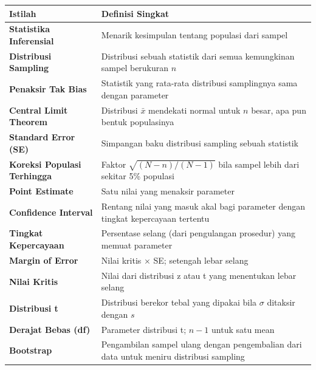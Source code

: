 \documentclass[
  indonesian,
  letterpaper,
]{book}
\newcounter{none} %
\begin{document}
{\def\LTcaptype{none} %
\begin{longtable}[]{@{}
  >{\raggedright\arraybackslash}p{}
  >{\raggedright\arraybackslash}p{}@{}}
\toprule\noalign{}
\begin{minipage}[b]{\linewidth}\raggedright
Istilah
\end{minipage} & \begin{minipage}[b]{\linewidth}\raggedright
Definisi Singkat
\end{minipage} \\
\midrule\noalign{}
\endhead
\bottomrule\noalign{}
\endlastfoot
\textbf{Statistika Inferensial} & Menarik kesimpulan tentang populasi
dari sampel \\
\textbf{Distribusi Sampling} & Distribusi sebuah statistik dari semua
kemungkinan sampel berukuran \(n\) \\
\textbf{Penaksir Tak Bias} & Statistik yang rata-rata distribusi
samplingnya sama dengan parameter \\
\textbf{Central Limit Theorem} & Distribusi \(\bar{x}\) mendekati normal
untuk \(n\) besar, apa pun bentuk populasinya \\
\textbf{Standard Error (SE)} & Simpangan baku distribusi sampling sebuah
statistik \\
\textbf{Koreksi Populasi Terhingga} & Faktor \(\sqrt{(N-n)/(N-1)}\) bila
sampel lebih dari sekitar 5\% populasi \\
\textbf{Point Estimate} & Satu nilai yang menaksir parameter \\
\textbf{Confidence Interval} & Rentang nilai yang masuk akal bagi
parameter dengan tingkat kepercayaan tertentu \\
\textbf{Tingkat Kepercayaan} & Persentase selang (dari pengulangan
prosedur) yang memuat parameter \\
\textbf{Margin of Error} & Nilai kritis \(\times\) SE; setengah lebar
selang \\
\textbf{Nilai Kritis} & Nilai dari distribusi z atau t yang menentukan
lebar selang \\
\textbf{Distribusi t} & Distribusi berekor tebal yang dipakai bila
\(\sigma\) ditaksir dengan \(s\) \\
\textbf{Derajat Bebas (df)} & Parameter distribusi t; \(n-1\) untuk satu
mean \\
\textbf{Bootstrap} & Pengambilan sampel ulang dengan pengembalian dari
data untuk meniru distribusi sampling \\
\end{longtable}
}
\end{document}

